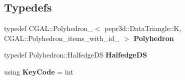 \subsection*{Typedefs}
\begin{DoxyCompactItemize}
\item 
\mbox{\label{namespacepepr3d_a563b915bfa736206efe7a9d727b6eb91}} 
typedef C\+G\+A\+L\+::\+Polyhedron\+\_$<$ pepr3d\+::\+Data\+Triangle\+::K, C\+G\+A\+L\+::\+Polyhedron\+\_\+items\+\_\+with\+\_\+id\+\_ $>$ {\bfseries Polyhedron}
\item 
\mbox{\label{namespacepepr3d_a57e58f67799ffb6171c38a38ccf540d3}} 
typedef Polyhedron\+::\+Halfedge\+DS {\bfseries Halfedge\+DS}
\item 
\mbox{\label{namespacepepr3d_af92da0512bc875cd394a2d2037f81c1c}} 
using {\bfseries Key\+Code} = int
\end{DoxyCompactItemize}
